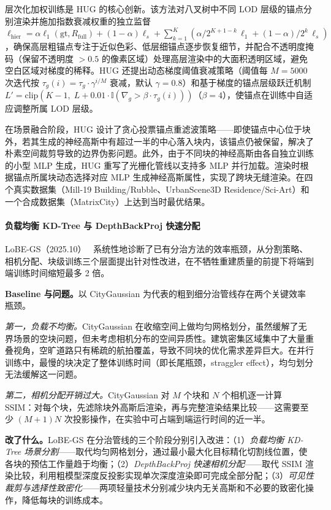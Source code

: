 层次化加权训练是 HUG 的核心创新。该方法对八叉树中不同 LOD 层级的锚点分别渲染并施加指数衰减权重的独立监督 $\ell_{\text{hier}} = \alpha \ell_1(\text{gt}, R_{\text{full}}) + (1-\alpha)\ell_s + \sum_{k=1}^{K}(\alpha/2^{K+1-k}\,\ell_1 + (1-\alpha)/2^k\,\ell_s)$，确保高层粗锚点专注于近似色彩、低层细锚点逐步恢复细节，并配合不透明度掩码（保留不透明度 $> 0.5$ 的像素区域）处理高层渲染中的大面积透明区域，避免空白区域对梯度的稀释。HUG 还提出动态梯度阈值衰减策略（阈值每 $M=5000$ 次迭代按 $\tau_g(i) = \tau_g \cdot \gamma^{i/M}$ 衰减，默认 $\gamma = 0.8$）和基于梯度的锚点层级跃迁机制 $L' = \text{clip}(K-1,\; L + 0.01 \cdot \mathbb{I}(\nabla_g > \beta \cdot \tau_g(i)))$（$\beta = 4$），使锚点在训练中自适应调整所属 LOD 层级。

在场景融合阶段，HUG 设计了贪心投票锚点重滤波策略——即使锚点中心位于块外，若其生成的神经高斯中有超过一半的中心落入块内，该锚点仍被保留，解决了朴素空间裁剪导致的边界伪影问题。此外，由于不同块的神经高斯由各自独立训练的小型 MLP 生成，HUG 重写了光栅化管线以支持多 MLP 并行加载。渲染时根据锚点所属块动态选择对应 MLP 生成神经高斯属性，实现了跨块无缝渲染。在四个真实数据集（Mill-19 Building/Rubble、UrbanScene3D Residence/Sci-Art）和一个合成数据集（MatrixCity）上达到当时最优结果。

\paragraph{负载均衡 KD-Tree 与 DepthBackProj 快速分配}

LoBE-GS（2025.10）~\cite{2510_01767} 系统性地诊断了已有分治方法的效率瓶颈，从分割策略、相机分配、块级训练三个层面提出针对性改进，在不牺牲重建质量的前提下将端到端训练时间缩短最多 2 倍。

\textbf{Baseline 与问题。}以 CityGaussian 为代表的粗到细分治管线存在两个关键效率瓶颈。

\emph{第一，负载不均衡。}CityGaussian 在收缩空间上做均匀网格划分，虽然缓解了无界场景的空块问题，但未考虑相机分布的空间异质性。建筑密集区域集中了大量重叠视角，空旷道路只有稀疏的航拍覆盖，导致不同块的优化需求差异巨大。在并行训练中，最慢的块决定了整体训练时间（即长尾瓶颈，straggler effect），均匀划分无法缓解这一问题。

\emph{第二，相机分配开销过大。}CityGaussian 对 $M$ 个块和 $N$ 个相机逐一计算 SSIM：对每个块，先滤除块外高斯后渲染，再与完整渲染结果比较——这需要至少 $(M+1)N$ 次投影操作，在实验中可占端到端运行时间的近一半。

\textbf{改了什么。}LoBE-GS 在分治管线的三个阶段分别引入改进：（1）\emph{负载均衡 KD-Tree 场景分割}——取代均匀网格划分，通过最小最大化目标精化切割线位置，使各块的预估工作量趋于均衡；（2）\emph{DepthBackProj 快速相机分配}——取代 SSIM 渲染比较，利用粗模型深度反投影实现单次深度渲染即可完成全部分配；（3）\emph{可见性裁剪与选择性致密化}——两项轻量技术分别减少块内无关高斯和不必要的致密化操作，降低每块的训练成本。

